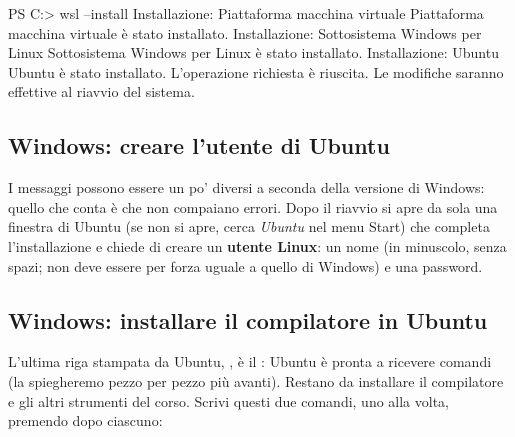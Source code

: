 \begin{console}
PS C:\WINDOWS{}> wsl --install
Installazione: Piattaforma macchina virtuale
Piattaforma macchina virtuale è stato installato.
Installazione: Sottosistema Windows per Linux
Sottosistema Windows per Linux è stato installato.
Installazione: Ubuntu
Ubuntu è stato installato.
L'operazione richiesta è riuscita. Le modifiche saranno effettive al riavvio del sistema.
\end{console}

\subsection{Windows: creare l'utente di Ubuntu}

I messaggi possono essere un po' diversi a seconda della versione di
Windows: quello che conta è che non compaiano errori. Dopo il riavvio si
apre da sola una finestra di Ubuntu (se non si apre, cerca \textit{Ubuntu}
nel menu Start) che completa l'installazione e chiede di creare un
\textbf{utente Linux}: un nome (in minuscolo, senza spazi; non deve essere
per forza uguale a quello di Windows) e una password.



\subsection{Windows: installare il compilatore in Ubuntu}

L'ultima riga stampata da Ubuntu, , è il
: Ubuntu è pronta a ricevere comandi (la spiegheremo pezzo per
pezzo più avanti). Restano da installare il compilatore e gli altri
strumenti del corso. Scrivi questi due comandi, uno alla volta, premendo
 dopo ciascuno:

